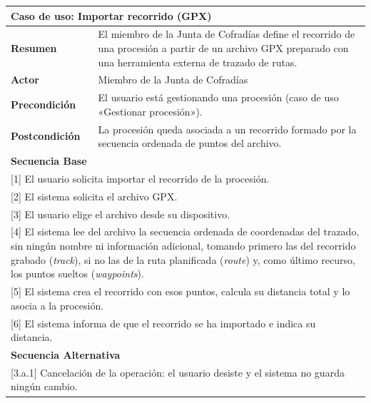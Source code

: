 \begin{table}[h!]
    \centering
    \renewcommand{\arraystretch}{1.5}

    \begin{tabular}{|p{4cm}|p{11cm}|}
        \hline
        \multicolumn{2}{|l|}{\textbf{Caso de uso: Importar recorrido (GPX)}} \\
        \hline
        \textbf{Resumen} & El miembro de la Junta de Cofradías define el recorrido de una procesión a partir de un archivo GPX preparado con una herramienta externa de trazado de rutas. \\
        \hline
        \textbf{Actor} & Miembro de la Junta de Cofradías \\
        \hline
        \textbf{Precondición} & El usuario está gestionando una procesión (caso de uso «Gestionar procesión»). \\
        \hline
        \textbf{Postcondición} & La procesión queda asociada a un recorrido formado por la secuencia ordenada de puntos del archivo. \\
        \hline
        \multicolumn{2}{|l|}{\textbf{Secuencia Base}} \\
        \hline
        \multicolumn{2}{|p{15cm}|}{ [1] El usuario solicita importar el recorrido de la procesión. } \\
        \hline
        \multicolumn{2}{|p{15cm}|}{ [2] El sistema solicita el archivo GPX. } \\
        \hline
        \multicolumn{2}{|p{15cm}|}{ [3] El usuario elige el archivo desde su dispositivo. } \\
        \hline
        \multicolumn{2}{|p{15cm}|}{ [4] El sistema lee del archivo la secuencia ordenada de coordenadas del trazado, sin ningún nombre ni información adicional, tomando primero las del recorrido grabado (\emph{track}), si no las de la ruta planificada (\emph{route}) y, como último recurso, los puntos sueltos (\emph{waypoints}). } \\
        \hline
        \multicolumn{2}{|p{15cm}|}{ [5] El sistema crea el recorrido con esos puntos, calcula su distancia total y lo asocia a la procesión. } \\
        \hline
        \multicolumn{2}{|p{15cm}|}{ [6] El sistema informa de que el recorrido se ha importado e indica su distancia. } \\
        \hline
        \multicolumn{2}{|l|}{\textbf{Secuencia Alternativa}} \\
        \hline
        \multicolumn{2}{|p{15cm}|}{ [3.a.1] Cancelación de la operación: el usuario desiste y el sistema no guarda ningún cambio. } \\

\end{tabular}
\end{table}
